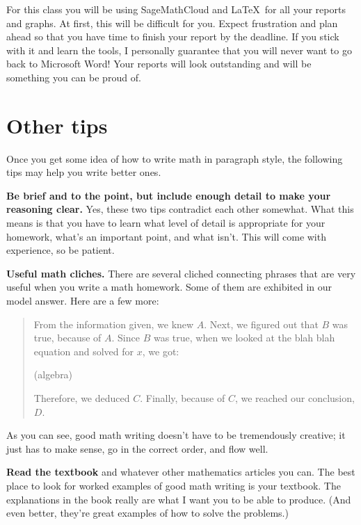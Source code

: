 \documentclass{article}
\begin{document}
For this class you will be using SageMathCloud and \LaTeX \, for all your reports and graphs. At first, this will be difficult for you. Expect frustration and plan ahead so that you have time to finish your report by the deadline. If you stick with it and learn the tools, I personally guarantee that you will never want to go back to Microsoft Word! Your reports will look outstanding and will be something you can be proud of.

\section*{Other tips}

Once you get some idea of how to write math in paragraph style, the following tips may help you write better ones.

\textbf{Be brief and to the point, but include enough detail to make your reasoning clear.} Yes, these two tips contradict each other somewhat. What this means is that you have to learn what level of detail is appropriate for your homework, what's an important point, and what isn't. This will come with experience, so be patient.

\textbf{Useful math cliches.} There are several cliched connecting phrases that are very useful when you write a math homework. Some of them are exhibited in our model answer. Here are a few more:

\begin{quote}
From the information given, we knew $A$. Next, we figured out that $B$ was true, because of $A$. Since $B$ was true, when we looked at the blah blah equation and solved for $x$, we got:
			\begin{center}(algebra)\end{center}
Therefore, we deduced $C$. Finally, because of $C$, we reached our conclusion, $D$.
\end{quote}

As you can see, good math writing doesn't have to be tremendously creative; it just has to make sense, go in the correct order, and flow well.

\textbf{Read the textbook} and whatever other mathematics articles you can. The best place to look for worked examples of good math writing is your textbook. The explanations in the book really are what I want you to be able to produce. (And even better, they're great examples of how to solve the problems.)
\end{document}
